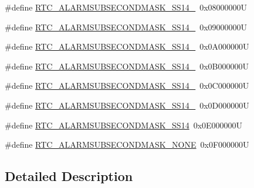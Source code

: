\begin{DoxyCompactItemize}
\item 
\#define \hyperlink{group___r_t_c___alarm___sub___seconds___masks___definitions_ga0f7cdfed3ad8bbe33fc2c4c2b8d5d2ce}{R\+T\+C\+\_\+\+A\+L\+A\+R\+M\+S\+U\+B\+S\+E\+C\+O\+N\+D\+M\+A\+S\+K\+\_\+\+S\+S14\+\_}~0x08000000U
\item 
\#define \hyperlink{group___r_t_c___alarm___sub___seconds___masks___definitions_ga173d153f6543cd34062d8ca14fb04975}{R\+T\+C\+\_\+\+A\+L\+A\+R\+M\+S\+U\+B\+S\+E\+C\+O\+N\+D\+M\+A\+S\+K\+\_\+\+S\+S14\+\_}~0x09000000U
\item 
\#define \hyperlink{group___r_t_c___alarm___sub___seconds___masks___definitions_ga7cb4d4abdac134b508cbb6e9b5d21638}{R\+T\+C\+\_\+\+A\+L\+A\+R\+M\+S\+U\+B\+S\+E\+C\+O\+N\+D\+M\+A\+S\+K\+\_\+\+S\+S14\+\_}~0x0\+A000000U
\item 
\#define \hyperlink{group___r_t_c___alarm___sub___seconds___masks___definitions_gaf67fcaa5c58e46e47d97be746c9dec24}{R\+T\+C\+\_\+\+A\+L\+A\+R\+M\+S\+U\+B\+S\+E\+C\+O\+N\+D\+M\+A\+S\+K\+\_\+\+S\+S14\+\_}~0x0\+B000000U
\item 
\#define \hyperlink{group___r_t_c___alarm___sub___seconds___masks___definitions_ga37c03d1ef098287fa559af1a28bd8ba5}{R\+T\+C\+\_\+\+A\+L\+A\+R\+M\+S\+U\+B\+S\+E\+C\+O\+N\+D\+M\+A\+S\+K\+\_\+\+S\+S14\+\_}~0x0\+C000000U
\item 
\#define \hyperlink{group___r_t_c___alarm___sub___seconds___masks___definitions_gada3b5b45dbdabf604340b0c09bdbdc2c}{R\+T\+C\+\_\+\+A\+L\+A\+R\+M\+S\+U\+B\+S\+E\+C\+O\+N\+D\+M\+A\+S\+K\+\_\+\+S\+S14\+\_}~0x0\+D000000U
\item 
\#define \hyperlink{group___r_t_c___alarm___sub___seconds___masks___definitions_ga91e1225dc11de4ce4bd74eb18fc155f7}{R\+T\+C\+\_\+\+A\+L\+A\+R\+M\+S\+U\+B\+S\+E\+C\+O\+N\+D\+M\+A\+S\+K\+\_\+\+S\+S14}~0x0\+E000000U
\item 
\#define \hyperlink{group___r_t_c___alarm___sub___seconds___masks___definitions_ga2c3802d48626766a3fc85ad910caea02}{R\+T\+C\+\_\+\+A\+L\+A\+R\+M\+S\+U\+B\+S\+E\+C\+O\+N\+D\+M\+A\+S\+K\+\_\+\+N\+O\+NE}~0x0\+F000000U
\end{DoxyCompactItemize}


\subsection{Detailed Description}


